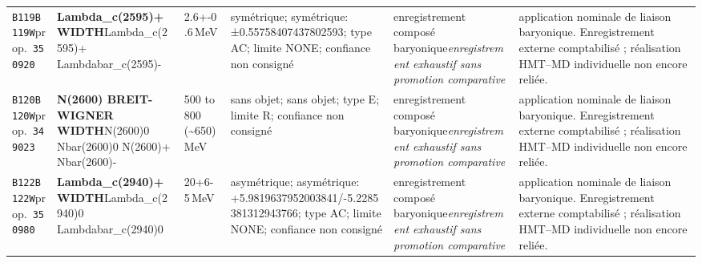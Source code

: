 \begin{landscape}
\begin{longtable}{L{1.85cm}L{4.45cm}L{2.35cm}L{4.05cm}L{3.35cm}L{7.15cm}}
\texttt{B119}\newline \texttt{B119W}\newline prop.\ \texttt{350920} & \textbf{Lambda\_\allowbreak{}c(2595)+ WIDTH}\newline Lambda\_\allowbreak{}c(2595)+ \textbar{}\allowbreak{} Lambdabar\_\allowbreak{}c(2595)- & 2.6+-0.6\,MeV & symétrique; symétrique: ±0.55758407437802593; type AC; limite NONE; confiance non consigné & enregistrement composé baryonique\newline \emph{enregistrement exhaustif sans promotion comparative} & application nominale de liaison baryonique. Enregistrement externe comptabilisé ; réalisation HMT--MD individuelle non encore reliée. \\
\texttt{B120}\newline \texttt{B120W}\newline prop.\ \texttt{349023} & \textbf{N(2600) BREIT-WIGNER WIDTH}\newline N(2600)0 \textbar{}\allowbreak{} Nbar(2600)0 \textbar{}\allowbreak{} N(2600)+ \textbar{}\allowbreak{} Nbar(2600)- & 500 to 800 (\textasciitilde{}650)\,MeV & sans objet; sans objet; type E; limite R; confiance non consigné & enregistrement composé baryonique\newline \emph{enregistrement exhaustif sans promotion comparative} & application nominale de liaison baryonique. Enregistrement externe comptabilisé ; réalisation HMT--MD individuelle non encore reliée. \\
\texttt{B122}\newline \texttt{B122W}\newline prop.\ \texttt{350980} & \textbf{Lambda\_\allowbreak{}c(2940)+ WIDTH}\newline Lambda\_\allowbreak{}c(2940)0 \textbar{}\allowbreak{} Lambdabar\_\allowbreak{}c(2940)0 & 20+6-5\,MeV & asymétrique; asymétrique: +5.9819637952003841/-5.2285381312943766; type AC; limite NONE; confiance non consigné & enregistrement composé baryonique\newline \emph{enregistrement exhaustif sans promotion comparative} & application nominale de liaison baryonique. Enregistrement externe comptabilisé ; réalisation HMT--MD individuelle non encore reliée. \\

\end{longtable}
\end{landscape}
